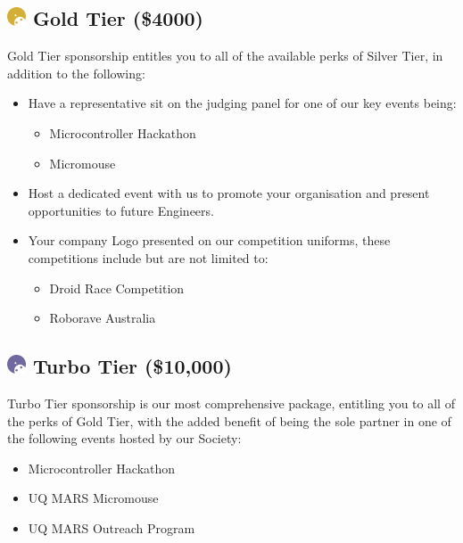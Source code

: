 \documentclass[a4paper,12pt]{report}
\begin{document}
\subsection*{
    \includegraphics[width=1em]{../assets/Sponsor Icons/Gold}
    \textcolor{sponsor_gold}{Gold Tier (\$4000)}
}
Gold Tier sponsorship entitles you to all of the available perks of Silver Tier, in addition to the following:
\begin{itemize}
    \item Have a representative sit on the judging panel for one of our key events being:
    
    \begin{itemize}
        \item Microcontroller Hackathon
        \item Micromouse
    \end{itemize}
    
    \item Host a dedicated event with us to promote your organisation and present opportunities to future Engineers.  
    
    \item Your company Logo presented on our competition uniforms, these competitions include but are not limited to: 
    \begin{itemize}
        \item Droid Race Competition
        \item Roborave Australia 
    \end{itemize}
\end{itemize}

\subsection*{
    \includegraphics[width=1em]{../assets/Sponsor Icons/Turbo.png}
    \textcolor{turbo_purple}{Turbo Tier (\$10,000)}
}
Turbo Tier sponsorship is our most comprehensive package, entitling you to all of the perks of Gold Tier, with the added benefit of being the sole partner in one of the following events hosted by our Society:
\begin{itemize}
    \item Microcontroller Hackathon 
    \item UQ MARS Micromouse 
    \item UQ MARS Outreach Program 
\end{itemize}
\end{document}
